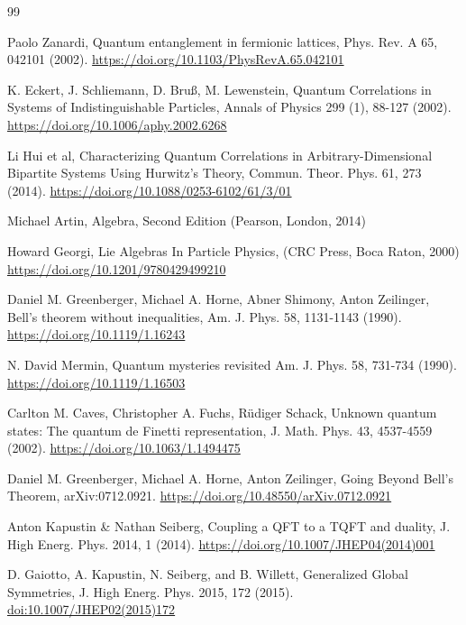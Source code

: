 \documentclass[12pt,a4paper]{article}
\begin{document}
\begin{thebibliography}{99}
	
	Paolo Zanardi,
	Quantum entanglement in fermionic lattices,
	Phys. Rev. A 65, 042101 (2002).
	\url{https://doi.org/10.1103/PhysRevA.65.042101}
	
	
	K. Eckert, J. Schliemann, D. Bruß, M. Lewenstein,
	Quantum Correlations in Systems of Indistinguishable Particles,
	Annals of Physics 299 (1), 88-127 (2002).
	\url{https://doi.org/10.1006/aphy.2002.6268}
	
	
	Li Hui et al,
	Characterizing Quantum Correlations in Arbitrary-Dimensional Bipartite Systems Using Hurwitz's Theory,
	Commun. Theor. Phys. 61, 273 (2014).
	\url{https://doi.org/10.1088/0253-6102/61/3/01}
	
	
	Michael Artin,
	Algebra,
	Second Edition (Pearson, London, 2014)
	
	
	Howard Georgi,
	Lie Algebras In Particle Physics,
	(CRC Press, Boca Raton, 2000)
	\url{https://doi.org/10.1201/9780429499210}
	
	
	Daniel M. Greenberger, Michael A. Horne, Abner Shimony, Anton Zeilinger,
	Bell’s theorem without inequalities,
	Am. J. Phys. 58, 1131-1143 (1990).
	\url{https://doi.org/10.1119/1.16243}
	
	
	N. David Mermin,
	Quantum mysteries revisited 
	Am. J. Phys. 58, 731-734 (1990).
	\url{https://doi.org/10.1119/1.16503}
	
	
	Carlton M. Caves, Christopher A. Fuchs, Rüdiger Schack,
	Unknown quantum states: The quantum de Finetti representation,
	J. Math. Phys. 43, 4537-4559 (2002).
	\url{https://doi.org/10.1063/1.1494475}
	
	
	Daniel M. Greenberger, Michael A. Horne, Anton Zeilinger,
	Going Beyond Bell's Theorem,
	arXiv:0712.0921.
	\url{https://doi.org/10.48550/arXiv.0712.0921}	
	
		
	
	Anton Kapustin \& Nathan Seiberg,
	Coupling a QFT to a TQFT and duality,
	J. High Energ. Phys. 2014, 1 (2014).
	\url{https://doi.org/10.1007/JHEP04(2014)001}
	
	
	D. Gaiotto, A. Kapustin, N. Seiberg, and B. Willett,
	Generalized Global Symmetries,
	J. High Energ. Phys. 2015, 172 (2015).
	\href{https://doi.org/10.1007/JHEP02(2015)172}{doi:10.1007/JHEP02(2015)172} 
	

\end{thebibliography}
\end{document}
